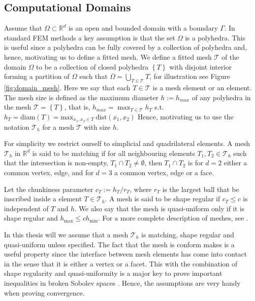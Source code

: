 \documentclass[11pt]{article}
\theoremstyle{remark}
\renewcommand{\le}{\leqslant}
\numberwithin{equation}{section}
\begin{document}
\subsection{Computational Domains}%
\label{sub:computational_domain}
Assume that $\Omega \subset \mathbb{R} ^{d} $ is an open and bounded domain with a boundary $\Gamma $. In standard FEM methods a key assumption is that the set $\Omega $ is a polyhedra. This is useful since a polyhedra can be fully covered by a collection of polyhedra and, hence, motivating us to define a fitted mesh.
We define a fitted mesh $\mathcal{T} $ of the domain $\Omega $ to be a collection of closed polyhedra $\left\{ T \right\}  $ with disjoint interior forming a partition of $\Omega $ such that $\overline{\Omega } = \bigcup _{T \in \mathcal{T} } T $, for illustration see Figure
\ref{fig:domain_mesh}.
Here we say that each $T \in  \mathcal{T} $ is a mesh element or an element.
The mesh size is defined as the maximum diameter $h := h_{max} $ of any polyhedra in the mesh $\mathcal{T} = \left\{ T \right\}  $, that is, $ h_{max} = \max_{T \in \mathcal{T} }  h_{T}$ s.t.
$h _{T}  = \mathrm{diam}\left( T \right)   = \mathrm{max}_{x_1, x_{2} \in T} \ \mathrm{ dist }(x_{1}, x_{2})$
Hence, motivating us to use the notation $\mathcal{T} _{h}$ for a mesh $\mathcal{T} $ with size $h$.

For simplicity we restrict ourself to simplicial and quadrilateral elements.
A mesh $\mathcal{T}_{h}$ in $ \mathbb{R} ^{d}$ is said to be matching if
for all neighbouring elements $T_{1}, T_{2} \in \mathcal{T} _{h}$ such that the intersection is non-empty, $T_{1} \cap T_{2} \neq \emptyset  $, then $T_{1}\cap T_{2}$ is for $d=2$ either a common vertex, edge, and for $d=3$ a common vertex, edge or a face.

Let the chunkiness parameter $c_{T} := h_{T}/r_{T}$, where $r_{T}$  is the largest ball that be inscribed inside a element $T \in \mathcal{T}_{h} $.
A mesh is said to be shape regular if $c_{T}\le  c$ is independent of $T$  and $h$. We also say that the mesh is quasi-uniform only if it is shape regular and $h_{\mathrm{ max }} \le  c h_{\mathrm{ min }}$.
For a more complete description of meshes, see \cite[Chapter 8]{ErnGuermond2021}.

In this thesis will we assume that a mesh $\mathcal{T}_{h} $ is matching, shape regular and quasi-uniform unless specified.
 The fact that the mesh is conform makes is a useful property since the interface between mesh elements has come into contact in the sense
that it is either a vertex or a facet. This with the combination of shape regularity and quasi-uniformity is a major key to prove important inequalities in broken Sobolev spaces \cite[Chapter 1.4.1]{pietro2012}. Hence, the assumptions are very handy when proving convergence.
\end{document}
